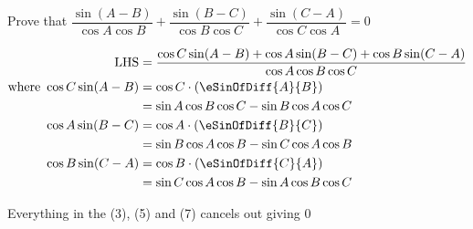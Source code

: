 
%
%
%
%
% 
% 

\question Prove that $\dfrac{\sin(A-B)}{\cos A\cos B} + \dfrac{\sin(B-C)}{\cos B\cos C} 
+ \dfrac{\sin(C-A)}{\cos C\cos A} = 0$

\insertQR{}

\ifprintanswers
\fi 

\begin{solution}
  \begin{fullwidth}
    \begin{align}
      \text{LHS} &= \dfrac{\cos C\sin(A-B) + \cos A\sin(B-C) + 
        \cos B\sin(C-A)}{\cos A\cos B\cos C} \\
      \text{where }\cos C\sin(A-B) &= \cos C\cdot(\eSinOfDiff{A}{B}) \\
           &= \sin A\cos B\cos C - \sin B\cos A\cos C \\
       \cos A\sin(B-C) &= \cos A\cdot(\eSinOfDiff{B}{C}) \\
          &= \sin B\cos A\cos B - \sin C\cos A\cos B \\
       \cos B\sin(C-A) &= \cos B\cdot(\eSinOfDiff{C}{A}) \\
          &= \sin C\cos A\cos B - \sin A\cos B\cos C
    \end{align}

    Everything in the (3), (5) and (7) cancels out giving $0$
  \end{fullwidth}
\end{solution}
